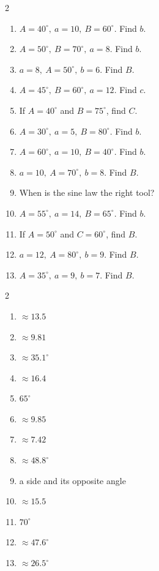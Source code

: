 \documentclass[11pt]{article}
\begin{document}
\begin{recapbox}
\begin{multicols}{2}
\small
\begin{enumerate}[leftmargin=*,itemsep=3pt]
  \item $A=40^\circ,\ a=10,\ B=60^\circ$. Find $b$.
  \item $A=50^\circ,\ B=70^\circ,\ a=8$. Find $b$.
  \item $a=8,\ A=50^\circ,\ b=6$. Find $B$.
  \item $A=45^\circ,\ B=60^\circ,\ a=12$. Find $c$.
  \item If $A=40^\circ$ and $B=75^\circ$, find $C$.
  \item $A=30^\circ,\ a=5,\ B=80^\circ$. Find $b$.
  \item $A=60^\circ,\ a=10,\ B=40^\circ$. Find $b$.
  \item $a=10,\ A=70^\circ,\ b=8$. Find $B$.
  \item When is the sine law the right tool?
  \item $A=55^\circ,\ a=14,\ B=65^\circ$. Find $b$.
  \item If $A=50^\circ$ and $C=60^\circ$, find $B$.
  \item $a=12,\ A=80^\circ,\ b=9$. Find $B$.
  \item $A=35^\circ,\ a=9,\ b=7$. Find $B$.
\end{enumerate}
\end{multicols}
\end{recapbox}

\begin{keybox}
\begin{multicols}{2}
\small
\begin{enumerate}[leftmargin=*,itemsep=3pt]
  \item $\approx13.5$
  \item $\approx9.81$
  \item $\approx35.1^\circ$
  \item $\approx16.4$
  \item $65^\circ$
  \item $\approx9.85$
  \item $\approx7.42$
  \item $\approx48.8^\circ$
  \item a side and its opposite angle
  \item $\approx15.5$
  \item $70^\circ$
  \item $\approx47.6^\circ$
  \item $\approx26.5^\circ$
\end{enumerate}
\end{multicols}
\end{keybox}
\end{document}
